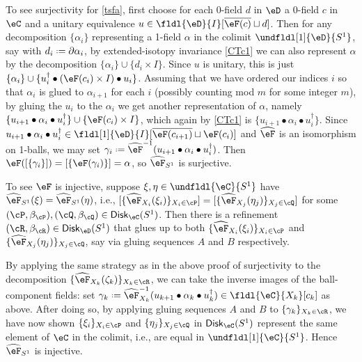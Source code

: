 \documentclass[12pt,reqno]{amsart}
\newcounter{alpha}\renewcommand\thealpha{\upshape\Alph{alpha}}
\newcommand{\Disk}{\mathsf{Disk}}
\newcommand{\C}{\eC}
\newcommand{\D}{\eD}
\newcommand{\blt}{\bullet}
\newcommand{\fcj}[1]{\overline{#1}}
\renewcommand{\amalg}{\sqcup}
\renewcommand{\star}{\dag}
\DeclareRobustCommand{\coloneq}{\mathrel{\vcenter{\baselineskip0.5ex\lineskiplimit0pt\hbox{\scriptsize{\upshape.}}\hbox{\scriptsize{\upshape.}}}}=}
\begin{document}
\begin{pf} 
To see surjectivity for \ref{tsfa}, first choose for each 0-field $d$ in $\D$ a 0-field $c$ in $\C$ and a unitary equivalence $u\in\fldl{\D}{I}[\fcj{\eF(c)}\amalg d]$. Then for any decomposition $\{\alpha_i\}$ representing a 1-field $\alpha$ in the colimit $\undfldl[1]{\D}{S^1}$, say with $d_i\coloneq\partial\alpha_i$, by extended-isotopy invariance \ref{CTc1} we can also represent $\alpha$ by the decomposition $\{\alpha_i\}\cup\{d_i\times I\}$. Since $u$ is unitary, this is just $\{\alpha_i\}\cup \{{u_i^\star\blt(\eF(c_i)\times I)\blt u_i}\}$. Assuming that we have ordered our indices $i$ so that $\alpha_i$ is glued to $\alpha_{i+1}$ for each $i$ (possibly counting mod $m$ for some integer $m$), by gluing the $u_i$ to the $\alpha_i$ we get another representation of $\alpha$, namely $\{u_{i+1}\bullet\alpha_i\bullet u_{i}^\star\}\cup\{\eF(c_i)\times I\}$, which again by \ref{CTc1} is $\{u_{i+1}\bullet\alpha_i\bullet u_{i}^\star\}$. Since $u_{i+1}\bullet\alpha_i\bullet u_{i}^\star\in\fldl[1]{\D}{I}[\fcj{\eF(c_{i+1})}\amalg \eF(c_i)]$ and $\widehat\eF$ is an isomorphism on 1-balls, we may set $\gamma_i\coloneq \widehat\eF^{-1}(u_{i+1}\bullet\alpha_i\bullet u_{i}^\star)$. Then $\eF([\{\gamma_i\}])=[\{\eF(\gamma_i)\}]=\alpha$, so $\widehat\eF_{S^1}$ is surjective. 

To see $\eF$ is injective, suppose $\xi,\eta\in\undfldl{\C}{S^1}$ have $\widehat\eF_{S^1}(\xi)=\widehat\eF_{S^1}(\eta)$, i.e., $[\{\widehat\eF_{X_i}(\xi_i)\}_{X_i \in \cP}] = [\{\widehat\eF_{X_j}(\eta_j)\}_{X_j \in\cQ}]$
for some $(\cP,\beta_\cP),(\cQ,\beta_\cQ)\in\Disk_\C(S^1)$.
Then there is a refinement $(\cR, \beta_\cR) \in\Disk_\eD(S^1)$ that glues up to both $\{\widehat{\eF}_{X_i}(\xi_i)\}_{X_i \in\cP}$ and $\{\widehat{\eF}_{X_j}(\eta_j)\}_{X_j \in\cQ}$, say via gluing sequences $A$ and $B$ respectively.

By applying the same strategy as in the above proof of surjectivity to the decomposition $\{\widehat{\eF}_{X_k}(\zeta_k)\}_{X_k \in\cR}$, we can take the inverse images of the ball-component fields: set $\gamma_k\coloneq \widehat{\eF}_{X_k}^{-1}(u_{k+1}\blt \alpha_k\blt u_k^\star) \in \fldl{\C}{X_k}[ c_k]$ as above. After doing so, by applying gluing sequences $A$ and $B$ to $\{\gamma_k\}_{X_k \in \cR}$, we have now shown $\{\xi_i\}_{X_i \in \cP}$ and $\{\eta_j\}_{X_j \in \cQ}$ in $\Disk_\C(S^1)$ represent the same element of $\C$ in the colimit, i.e., are equal in $\undfldl[1]{\C}{S^1}$. Hence $\widehat{\eF}_{S^1}$ is injective.


\end{pf}
\end{document}
